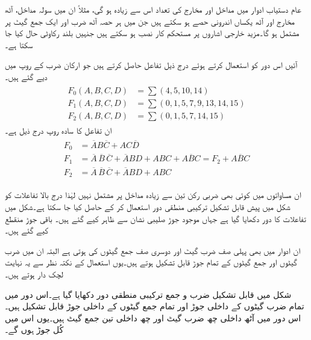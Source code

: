 عام دستیاب ادوار میں مداخل اور مخارج  کی تعداد اس سے زیادہ ہو گی، مثلاً  ان  میں سولہ مداخل، آٹھ مخارج اور آٹھ یکساں اندرونی حصے ہو سکتے ہیں جن میں ہر حصہ آٹھ ضرب اور ایک جمع گیٹ پر مشتمل ہو گا۔مزید خارجی   اشاروں   پر مستحکم کار نصب ہو سکتے ہیں جنہیں   بلند  رکاوٹی حال کیا جا سکتا ہے۔

آئیں اس دور کو استعمال کرتے ہوئے  درج ذیل تفاعل حاصل کرتے ہیں جو ارکان ضرب کے روپ میں دیے گئے ہیں۔
\begin{gather}
\begin{aligned}
F_0(A,B,C,D)&=\sum(4,5,10,14)\\
F_1(A,B,C,D)&=\sum(0,1,5,7,9,13,14,15)\\
F_2(A,B,C,D)&=\sum(0,1,5,7,14,15)
\end{aligned}
\end{gather}
ان تفاعل کا سادہ  روپ درج ذیل ہے۔
\begin{gather}
\begin{aligned}
F_0&=\overline{A}B\overline{C}+AC\overline{D}\\
F_1&=\overline{A}\,\overline{B}\,\overline{C}+\overline{A}BD+ABC+A\overline{B}C=F_2+A\overline{B}C\\
F_2&=\overline{A}\,\overline{B}\,\overline{C}+\overline{A}BD+ABC
\end{aligned}
\end{gather}

ان مساواتوں میں کوئی بھی ضربی رکن تین سے زیادہ مداخل پر مشتمل نہیں لہٰذا  درج بالا تفاعلات کو  شکل   میں پیش  قابل تشکیل ترکیبی منطقی دور استعمال کر کے حاصل کیا جا سکتا ہے۔شکل  میں تفاعلات کا دور دکھایا گیا ہے جہاں موجود  جوڑ صلیبی نشان  سے ظاہر کیے  گئے ہیں۔ باقی جوڑ منقطع کیے گئے ہیں۔


ان ادوار میں بھی پہلی صف ضرب گیٹ اور دوسری صف جمع گیٹوں کی ہوتی ہے البتہ ان میں ضرب گیٹوں اور جمع گیٹوں کے تمام جوڑ قابل تشکیل ہوتے ہیں۔یوں  استعمال کے نکتہ نظر سے  یہ نہایت لچک دار ہوتے ہیں۔ 


شکل میں قابل تشکیل ضرب و جمع ترکیبی منطقی دور دکھایا گیا ہے۔اس دور میں تمام ضرب گیٹوں کے داخلی جوڑ    اور تمام جمع گیٹوں کے داخلی جوڑ قابل تشکیل ہیں۔اس دور میں آٹھ داخلی چھ  ضرب گیٹ اور چھ  داخلی تین جمع گیٹ ہیں۔یوں اس میں کُل جوڑ  ہوں گے۔


